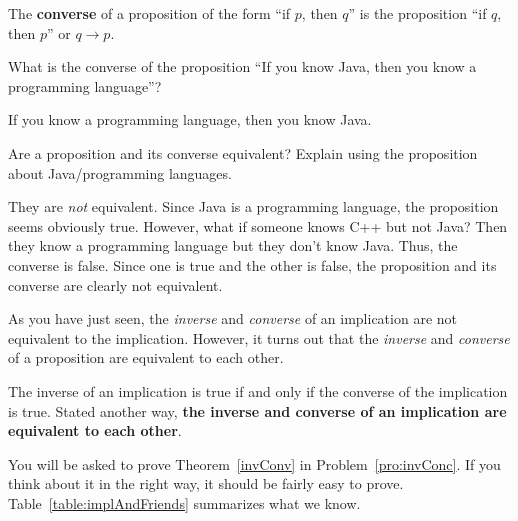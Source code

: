 \begin{df}
The {\bf converse} of a proposition of the form ``if $p$, then $q$'' is the proposition ``if $q$, then $p$''
or $q \rightarrow  p$.
\end{df}

\begin{ques}
What is the converse of the proposition ``If you know Java, then you know a programming language''?\\
\answerline
\begin{answer}
If you know a programming language, then you know Java.
\end{answer}
\end{ques}

\begin{ques}
Are a proposition and its converse equivalent?  Explain using the proposition about Java/programming languages.\\
\answerlinethree
\begin{answer}
They are {\em not} equivalent.  Since Java is a programming language, the proposition seems obviously true.
However, what if someone knows C++ but not Java?  Then they know a programming language but they don't
know Java. Thus, the converse is false.  Since one is true and the other is false, 
the proposition and its converse are clearly not equivalent.
\end{answer}
\end{ques}

As you have just seen, the {\em inverse} and {\em converse} of an implication are not equivalent to
the implication.  However, it turns out that 
the {\em inverse} and {\em converse} of a proposition are equivalent to each other.

\begin{thm}\label{invConv}
The inverse of an implication is true if and only if the converse of the implication is true.
Stated another way, 
{\bf the inverse and converse of an implication are equivalent
to each other}.
\end{thm}

You will be asked to prove Theorem~\ref{invConv} in Problem~\ref{pro:invConc}.  If you think about it in the right way,
it should be fairly easy to prove.
Table~\ref{table:implAndFriends} summarizes what we know.

